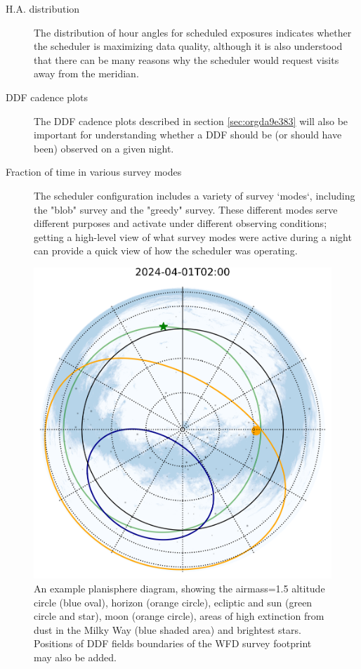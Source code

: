\begin{description}
\item[{H.A. distribution}] The distribution of hour angles for scheduled exposures indicates whether the scheduler is maximizing data quality, although it is also understood that there can be many reasons why the scheduler would request visits away from the meridian. 
\item[{DDF cadence plots}] The DDF cadence plots described in section \ref{sec:orgda9e383} will also be important for understanding whether a DDF should be (or should have been) observed on a given night.
\item[{Fraction of time in various survey modes}] The scheduler configuration includes a variety of survey `modes`, including the "blob" survey and the "greedy" survey. These different modes serve different purposes and activate under different observing conditions; getting a high-level view of what survey modes were active during a night can provide a quick view of how the scheduler was operating.
\end{description}

\begin{figure}[htbp]
\centering
\includegraphics[height=0.4\textheight]{./figures/airmass_map.png}
\caption{\label{fig:org3ac5503}An example planisphere diagram, showing the airmass=1.5 altitude circle (blue oval), horizon (orange circle), ecliptic and sun (green circle and star), moon (orange circle), areas of high extinction from dust in the Milky Way (blue shaded area) and brightest stars. Positions of DDF fields boundaries of the WFD survey footprint may also be added.}
\end{figure}

